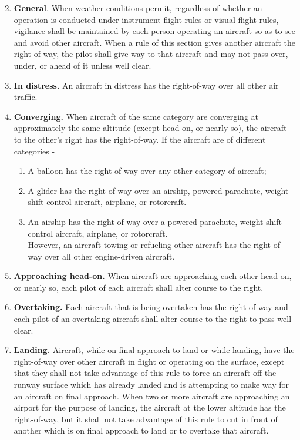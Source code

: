 \documentclass[12pt]{article}
\begin{document}
				\begin{enumerate}[label=(\alph*.)]
					\setcounter{enumi}{1}
					\item \textbf{General}. When weather conditions permit, regardless of whether an operation is conducted under instrument flight rules or visual flight rules, vigilance shall be maintained by each person operating an aircraft so as to see and avoid other aircraft. When a rule of this section gives another aircraft the right-of-way, the pilot shall give way to that aircraft and may not pass over, under, or ahead of it unless well clear.
					\item \textbf{In distress.} An aircraft in distress has the right-of-way over all other air traffic.
					\item \textbf{Converging.} When aircraft of the same category are converging at approximately the same altitude (except head-on, or nearly so), the aircraft to the other's right has the right-of-way. If the aircraft are of different categories -
					\begin{enumerate}[label=\arabic*.]
						\item A balloon has the right-of-way over any other category of aircraft;
						\item A glider has the right-of-way over an airship, powered parachute, weight-shift-control aircraft, airplane, or rotorcraft.
						\item  An airship has the right-of-way over a powered parachute, weight-shift-control aircraft, airplane, or rotorcraft.\\	
						However, an aircraft towing or refueling other aircraft has the right-of-way over all other engine-driven aircraft.
					\end{enumerate}

					\item \textbf{Approaching head-on.} When aircraft are approaching each other head-on, or nearly so, each pilot of each aircraft shall alter course to the right.

					\item \textbf{Overtaking.} Each aircraft that is being overtaken has the right-of-way and each pilot of an overtaking aircraft shall alter course to the right to pass well clear.

					\item \textbf{Landing.} Aircraft, while on final approach to land or while landing, have the right-of-way over other aircraft in flight or operating on the surface, except that they shall not take advantage of this rule to force an aircraft off the runway surface which has already landed and is attempting to make way for an aircraft on final approach. When two or more aircraft are approaching an airport for the purpose of landing, the aircraft at the lower altitude has the right-of-way, but it shall not take advantage of this rule to cut in front of another which is on final approach to land or to overtake that aircraft.
				\end{enumerate}
\newpage
\end{document}
